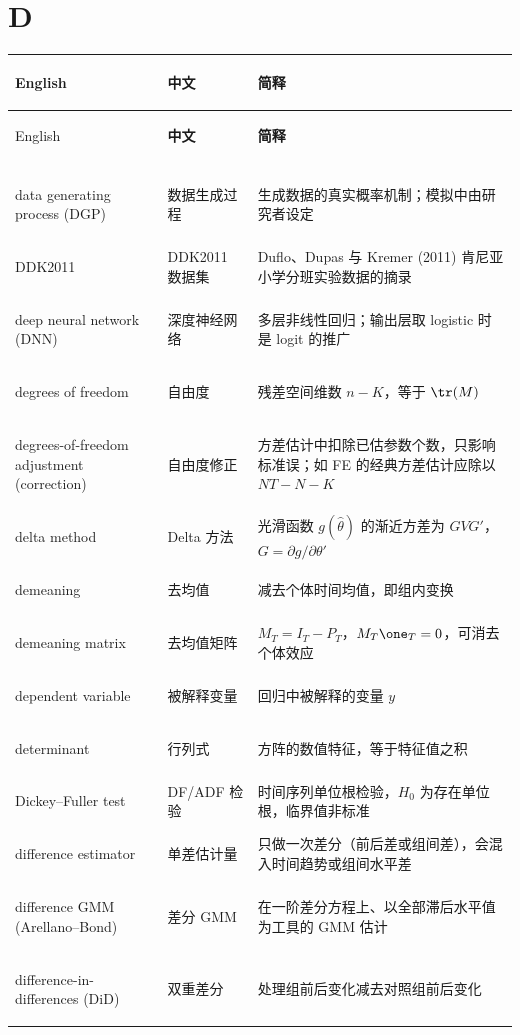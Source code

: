 \par{}\ifdim\dimexpr\pagegoal-\pagetotal\relax<16\baselineskip\newpage\fi
\section*{D}
\begin{longtable}{@{}>{\bfseries\boldmath\raggedright\arraybackslash}p{4.6cm}>{\raggedright\arraybackslash}p{3.2cm}>{\raggedright\arraybackslash}p{\dimexpr\textwidth-7.8cm-4\tabcolsep\relax}@{}}
\toprule
English & \textbf{中文} & \textbf{简释}\\
\midrule
\endfirsthead
\toprule
English & \textbf{中文} & \textbf{简释}\\
\midrule
\endhead
\midrule
\multicolumn{3}{r@{}}{\footnotesize\itshape （续下页）}\\
\endfoot
\bottomrule
\endlastfoot
data generating process (DGP) & 数据生成过程 & 生成数据的真实概率机制；模拟中由研究者设定 \\
DDK2011 & DDK2011 数据集 & Duflo、Dupas 与 Kremer (2011) 肯尼亚小学分班实验数据的摘录 \\
deep neural network (DNN) & 深度神经网络 & 多层非线性回归；输出层取 logistic 时是 logit 的推广 \\
degrees of freedom & 自由度 & 残差空间维数 $n-K$，等于 $\tr(M)$ \\
degrees-of-freedom adjustment (correction) & 自由度修正 & 方差估计中扣除已估参数个数，只影响标准误；如 FE 的经典方差估计应除以 $NT-N-K$ \\
delta method & Delta 方法 & 光滑函数 $g(\hat\theta)$ 的渐近方差为 $GVG'$，$G=\partial g/\partial\theta'$ \\
demeaning & 去均值 & 减去个体时间均值，即组内变换 \\
demeaning matrix & 去均值矩阵 & $M_T=I_T-P_T$，$M_T\one_T=0$，可消去个体效应 \\
dependent variable & 被解释变量 & 回归中被解释的变量 $y$ \\
determinant & 行列式 & 方阵的数值特征，等于特征值之积 \\
Dickey--Fuller test & DF/ADF 检验 & 时间序列单位根检验，$H_0$ 为存在单位根，临界值非标准 \\
difference estimator & 单差估计量 & 只做一次差分（前后差或组间差），会混入时间趋势或组间水平差 \\
difference GMM (Arellano--Bond) & 差分 GMM & 在一阶差分方程上、以全部滞后水平值为工具的 GMM 估计 \\
difference-in-differences (DiD) & 双重差分 & 处理组前后变化减去对照组前后变化 \\

\end{longtable}
